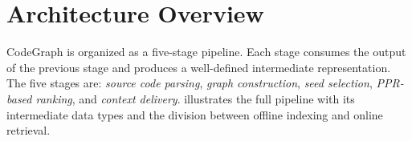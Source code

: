 \section{Architecture Overview}
\label{sec:architecture}

CodeGraph is organized as a five-stage pipeline. Each stage consumes the output of the previous stage and produces a well-defined intermediate representation. The five stages are: \emph{source code parsing}, \emph{graph construction}, \emph{seed selection}, \emph{PPR-based ranking}, and \emph{context delivery}.  illustrates the full pipeline with its intermediate data types and the division between offline indexing and online retrieval.

